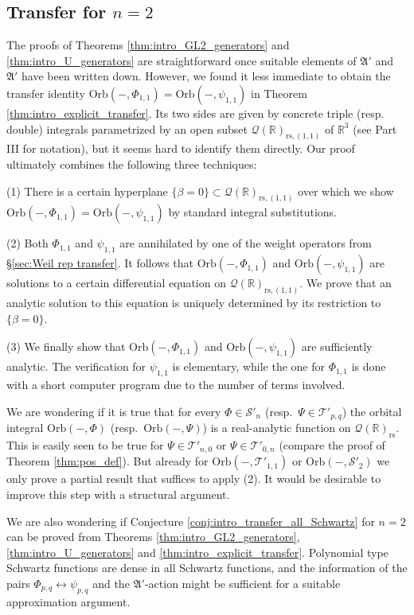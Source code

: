 \documentclass[reqno, 11pt]{amsart} %
\numberwithin{equation}{section}
\theoremstyle{plain}
\theoremstyle{definition}
\theoremstyle{remark}
\newcommand{\mr}{\mathrm}
\newcommand{\mbR}{\mathbb{R}}
\newcommand{\mcQ}{\mathcal{Q}}
\newcommand{\mcS}{\mathcal{S}}
\newcommand{\mcT}{\mathcal{T}}
\newcommand{\mfA}{\mathfrak{A}}
\newcommand{\rs}{\mr{rs}}
\newcommand{\Orb}{\mathrm{Orb}}
\newcommand{\mn}{\medskip \noindent}
\begin{document}
\subsection{Transfer for $n = 2$}

The proofs of Theorems \ref{thm:intro_GL2_generators} and \ref{thm:intro_U_generators} are straightforward once suitable elements of $\mfA'$ and $\mfA'$ have been written down. However, we found it less immediate to obtain the transfer identity $\Orb(-,Φ_{1,1}) = \Orb(-,ψ_{1,1})$ in Theorem \ref{thm:intro_explicit_transfer}. Its two sides are given by concrete triple (resp. double) integrals parametrized by an open subset $\mcQ(\mbR)_{\rs, (1,1)}$ of $\mbR^3$ (see Part III for notation), but it seems hard to identify them directly. Our proof ultimately combines the following three techniques:

\mn (1) There is a certain hyperplane $\{β = 0\}\subset \mcQ(\mbR)_{\rs,(1,1)}$ over which we show $\Orb(-,Φ_{1,1}) = \Orb(-,ψ_{1,1})$ by standard integral substitutions.

\mn (2) Both $Φ_{1,1}$ and $ψ_{1,1}$ are annihilated by one of the weight operators from \S\ref{sec:Weil rep transfer}. It follows that $\Orb(-,Φ_{1,1})$ and $\Orb(-,ψ_{1,1})$ are solutions to a certain differential equation on $\mcQ(\mbR)_{\rs,(1,1)}$. We prove that an analytic solution to this equation is uniquely determined by its restriction to $\{β = 0\}$.

\mn (3) We finally show that $\Orb(-,Φ_{1,1})$ and $\Orb(-,ψ_{1,1})$ are sufficiently analytic. The verification for $ψ_{1,1}$ is elementary, while the one for $Φ_{1,1}$ is done with a short computer program due to the number of terms involved.

\mn We are wondering if it is true that for every $Φ \in \mcS'_n$ (resp.\ $Ψ\in \mcT'_{p,q}$) the orbital integral $\Orb(-,Φ)$ (resp.\ $\Orb(-,Ψ)$) is a real-analytic function on $\mcQ(\mbR)_\rs$. This is easily seen to be true for $Ψ\in \mcT'_{n,0}$ or $Ψ\in \mcT'_{0,n}$ (compare the proof of Theorem \ref{thm:pos_def}). But already for $\Orb(-,\mcT'_{1,1})$ or $\Orb(-,\mcS'_2)$ we only prove a partial result that suffices to apply (2). It would be desirable to improve this step with a structural argument.

We are also wondering if Conjecture \ref{conj:intro_transfer_all_Schwartz} for $n = 2$ can be proved from Theorems \ref{thm:intro_GL2_generators}, \ref{thm:intro_U_generators} and \ref{thm:intro_explicit_transfer}. Polynomial type Schwartz functions are dense in all Schwartz functions, and the information of the pairs $Φ_{p,q} \leftrightarrow ψ_{p,q}$ and the $\mfA'$-action might be sufficient for a suitable approximation argument.
\end{document}
